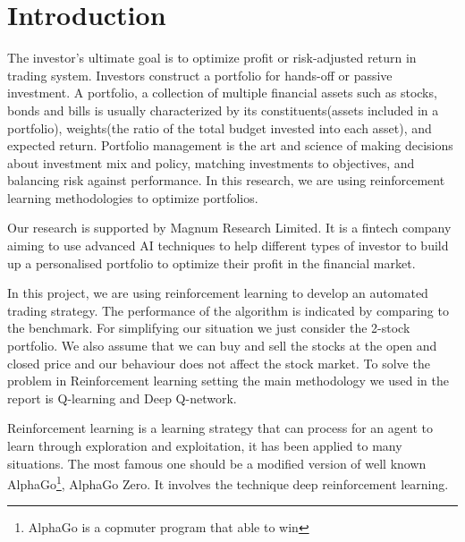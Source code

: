 \chapter{Introduction}\label{Ch:Introduction}

The investor’s ultimate goal is to optimize profit or risk-adjusted return in trading system. Investors construct a portfolio for hands-off or passive investment. A portfolio, a collection of multiple financial assets such as stocks, bonds and bills is usually characterized by its constituents(assets included in a portfolio), weights(the ratio of the total budget invested into each asset), and expected return. Portfolio management is the art and science of making decisions about investment mix and policy, matching investments to objectives, and balancing risk against performance. In this research, we are using reinforcement learning methodologies to optimize portfolios. 

Our research is supported by Magnum Research Limited. It is a fintech company aiming to use advanced AI techniques to help different types of investor to build up a personalised portfolio to optimize their profit in the financial market.

In this project, we are using reinforcement learning to develop an automated trading strategy. The performance of the algorithm is indicated by comparing to the benchmark. For simplifying our situation we just consider the 2-stock portfolio. We also assume that we can buy and sell the stocks at the open and closed price and our behaviour does not affect the stock market. To solve the problem in Reinforcement learning setting the main methodology we used in the report is Q-learning and Deep Q-network. 

Reinforcement learning is a learning strategy that can 
process for an agent to learn through exploration and exploitation, it has been applied to many situations. The most famous one should be a modified version of well known AlphaGo\footnote{AlphaGo is a copmuter program that able to win }, AlphaGo Zero. It involves the technique deep reinforcement learning. 